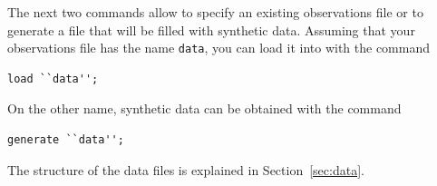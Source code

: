 The next two commands allow to specify an existing observations file
or to generate a file that will be filled with synthetic data.
Assuming that your observations file has the name \verb|data|, you can
load it into \amlet{} with the command
\begin{verbatim}
load ``data'';
\end{verbatim}
On the other name, synthetic data can be obtained with the command
\begin{verbatim}
generate ``data'';
\end{verbatim}
The structure of the data files is explained in Section~\ref{sec:data}.
